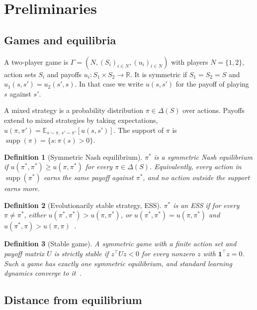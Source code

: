 \documentclass{article}
\newtheorem{definition}{Definition}
\newcommand{\R}{\mathbb{R}}
\newcommand{\E}{\mathbb{E}}
\begin{document}
\section{Preliminaries}
\label{sec:prelim}

\subsection{Games and equilibria}

A two-player game is $\Gamma = (N, (S_i)_{i\in N}, (u_i)_{i \in N})$ with players $N = \{1,2\}$, action sets $S_i$ and payoffs $u_i : S_1 \times S_2 \to \R$. It is symmetric if $S_1 = S_2 = S$ and $u_1(s,s') = u_2(s',s)$. In that case we write $u(s,s')$ for the payoff of playing $s$ against $s'$.

A mixed strategy is a probability distribution $\pi \in \Delta(S)$ over actions. Payoffs extend to mixed strategies by taking expectations, $u(\pi,\pi') = \E_{s \sim \pi,\, s' \sim \pi'}[u(s,s')]$. The support of $\pi$ is $\operatorname{supp}(\pi) = \{s : \pi(s) > 0\}$.

\begin{definition}[Symmetric Nash equilibrium]
$\pi^*$ is a symmetric Nash equilibrium if $u(\pi^*,\pi^*) \ge u(\pi,\pi^*)$ for every $\pi \in \Delta(S)$. Equivalently, every action in $\operatorname{supp}(\pi^*)$ earns the same payoff against $\pi^*$, and no action outside the support earns more.
\end{definition}

\begin{definition}[Evolutionarily stable strategy, ESS]
$\pi^*$ is an ESS if for every $\pi \ne \pi^*$, either $u(\pi^*,\pi^*) > u(\pi,\pi^*)$, or $u(\pi^*,\pi^*) = u(\pi,\pi^*)$ and $u(\pi^*,\pi) > u(\pi,\pi)$~\cite{maynardsmith1974}.
\end{definition}

\begin{definition}[Stable game]
A symmetric game with a finite action set and payoff matrix $U$ is strictly stable if $z^\top U z < 0$ for every nonzero $z$ with $\mathbf 1^\top z = 0$. Such a game has exactly one symmetric equilibrium, and standard learning dynamics converge to it~\cite{hofbauer2009}.
\end{definition}

\subsection{Distance from equilibrium}
\end{document}
